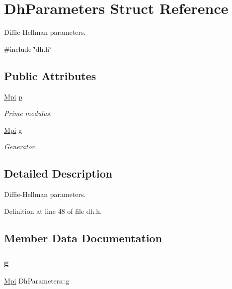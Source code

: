 \hypertarget{structDhParameters}{}\section{Dh\+Parameters Struct Reference}
\label{structDhParameters}


Diffie-\/\+Hellman parameters.  




{\ttfamily \#include \char`\"{}dh.\+h\char`\"{}}

\subsection*{Public Attributes}
\begin{DoxyCompactItemize}
\item 
\hyperlink{structMpi}{Mpi} \hyperlink{structDhParameters_ae39a6a92b952ae9c49c66c5c9c131a3b}{p}
\begin{DoxyCompactList}\small\item\em Prime modulus. \end{DoxyCompactList}\item 
\hyperlink{structMpi}{Mpi} \hyperlink{structDhParameters_abc22697d6ee37e502b54f988a1c4393d}{g}
\begin{DoxyCompactList}\small\item\em Generator. \end{DoxyCompactList}\end{DoxyCompactItemize}


\subsection{Detailed Description}
Diffie-\/\+Hellman parameters. 

Definition at line 48 of file dh.\+h.



\subsection{Member Data Documentation}
\mbox{\label{structDhParameters_abc22697d6ee37e502b54f988a1c4393d}} 
\subsubsection{\texorpdfstring{g}{g}}
{\footnotesize\ttfamily \hyperlink{structMpi}{Mpi} Dh\+Parameters\+::g}



